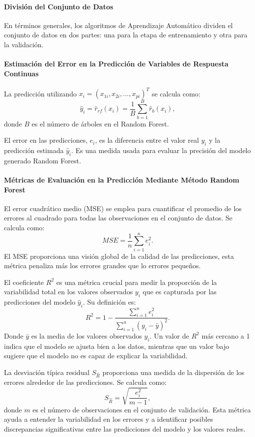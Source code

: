 \paragraph{División del Conjunto de Datos}

En términos generales, los algoritmos de Aprendizaje Automático dividen el conjunto de datos en dos partes: una para la etapa de entrenamiento y otra para la validación.

\paragraph{Estimación del Error en la Predicción de Variables de Respuesta Continuas}

La predicción utilizando \(x_i = (x_{1i}, x_{2i}, \ldots, x_{pi})^T\) se calcula como:
\[ \hat{y}_i = \hat{r}_{rf}(x_i) = \frac{1}{B} \sum_{b=1}^{B} \hat{r}_b(x_i),\]
donde \(B\) es el número de árboles en el Random Forest.

El error en las predicciones, \(e_i\), es la diferencia entre el valor real \(y_i\) y la predicción estimada \(\hat{y}_i\). Es una medida usada para evaluar la precisión del modelo generado Random Forest. 

\paragraph{Métricas de Evaluación en la Predicción Mediante Método Random Forest}

El error cuadrático medio (MSE) se emplea para cuantificar el promedio de los errores al cuadrado para todas las observaciones en el conjunto de datos. Se calcula como:
\[ MSE = \frac{1}{n} \sum_{i=1}^{n} e_i^2.\]
El MSE proporciona una visión global de la calidad de las predicciones, esta métrica penaliza más los errores grandes que lo errores pequeños.

El coeficiente \(R^2\) es una métrica crucial para medir la proporción de la variabilidad total en los valores observados \(y_i\) que es capturada por las predicciones del modelo \(\hat{y}_i\). Su definición es:
\[ R^2 = 1 - \frac{\sum_{i=1}^{n} e_i^2}{\sum_{i=1}^{n} (y_i - \bar{y})^2}.\]
Donde \(\bar{y}\) es la media de los valores observados \(y_i\). Un valor de \(R^2\) más cercano a 1 indica que el modelo se ajusta bien a los datos, mientras que un valor bajo sugiere que el modelo no es capaz de explicar la variabilidad.

La desviación típica residual \(S_{\hat{R}}\) proporciona una medida de la dispersión de los errores alrededor de las predicciones. Se calcula como:
\[ S_{\hat{R}} = \sqrt{\frac{e_i^2}{m-1}},\]
donde \(m\) es el número de observaciones en el conjunto de validación. Esta métrica ayuda a entender la variabilidad en los errores y a identificar posibles discrepancias significativas entre las predicciones del modelo y los valores reales.

